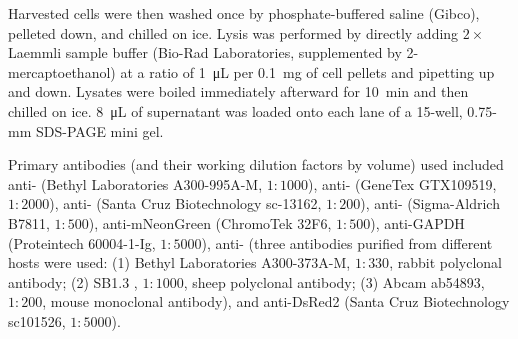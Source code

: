 Harvested cells were then washed once by phosphate-buffered saline (Gibco), pelleted down, and chilled on ice. Lysis was performed by directly adding $2 \times$ Laemmli sample buffer (Bio-Rad Laboratories, supplemented by 2-mercaptoethanol) at a ratio of \SI{1}{\micro L} per \SI{0.1}{mg} of cell pellets and pipetting up and down. Lysates were boiled immediately afterward for \SI{10}{min} and then chilled on ice. \SI{8}{\micro L} of supernatant was loaded onto each lane of a 15-well, 0.75-mm SDS-PAGE mini gel.

Primary antibodies (and their working dilution factors by volume) used included anti- (Bethyl Laboratories A300-995A-M, $1 : 1000$), anti- (GeneTex GTX109519, $1 : 2000$), anti- (Santa Cruz Biotechnology sc-13162, $1 : 200$), anti- (Sigma-Aldrich B7811, $1 : 500$), anti-mNeonGreen (ChromoTek 32F6, $1 : 500$), anti-GAPDH (Proteintech 60004-1-Ig, $1 : 5000$), anti- (three antibodies purified from different hosts were used: (1) Bethyl Laboratories A300-373A-M, $1 : 330$, rabbit polyclonal antibody; (2) SB1.3 \cite{SheepAntiBUB1}, $1 : 1000$, sheep polyclonal antibody; (3) Abcam ab54893, $1 : 200$, mouse monoclonal antibody), and anti-DsRed2 (Santa Cruz Biotechnology sc101526, $1 : 5000$).